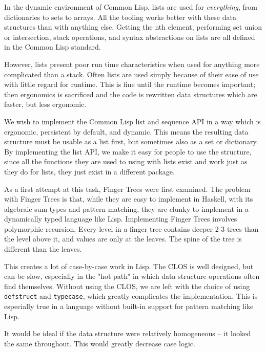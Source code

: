 \documentclass[sigconf]{acmart}
\begin{document}
In the dynamic environment of Common Lisp, lists are used for  \emph{everything}, from
dictionaries to sets to arrays. All the tooling works better with these data
structures than with anything else. Getting the nth element, performing set
union or intersection, stack operations, and syntax abstractions on lists are
all defined in the Common Lisp standard.

However, lists present poor run time characteristics when used for anything more
complicated than a stack. Often lists are used simply because of their ease of
use with little regard for runtime. This is fine until the runtime becomes
important; then ergonomics is sacrificed and the code is rewritten data
structures which are faster, but less ergonomic.

We wish to implement the Common Lisp list and sequence API in a way which is
ergonomic, persistent by default, and dynamic. This means the resulting data
structure must be usable as a list first, but sometimes also as a set or
dictionary. By implementing the list API, we make it easy for people to use the
structure, since all the functions they are used to using with lists exist and
work just as they do for lists, they just exist in a different package.

As a first attempt at this task, Finger Trees \cite{Hinze-Paterson:FingerTree}
were first examined. The problem with Finger Trees is that, while they are easy
to implement in Haskell, with its algebraic sum types and pattern matching, they
are clunky to implement in a dynamically typed language like Lisp. Implementing
Finger Trees involves polymorphic recursion. Every level in a finger tree
contains deeper 2-3 trees than the level above it, and values are only at the
leaves. The spine of the tree is different than the leaves.

This creates a lot of case-by-case work in Lisp. The CLOS is well designed, but
can be slow, especially in the "hot path" in which data structure operations
often find themselves. Without using the CLOS, we are left with the choice of
using \texttt{defstruct} and \texttt{typecase}, which greatly complicates the implementation.
This is especially true in a language without built-in support for pattern
matching like Lisp.

It would be ideal if the data structure were relatively homogeneous -- it looked
the same throughout. This would greatly decrease case logic.
\end{document}
